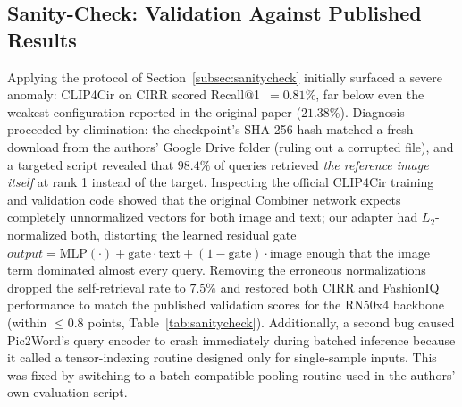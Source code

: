 \documentclass[conference]{IEEEtran}
\begin{document}
\subsection{Sanity-Check: Validation Against Published Results}
\label{subsec:sanitycheckresults}

Applying the protocol of Section~\ref{subsec:sanitycheck} initially surfaced a severe anomaly: CLIP4Cir on CIRR scored Recall@1~$=0.81\%$, far below even the weakest configuration reported in the original paper ($21.38\%$). Diagnosis proceeded by elimination: the checkpoint's SHA-256 hash matched a fresh download from the authors' Google Drive folder (ruling out a corrupted file), and a targeted script revealed that $98.4\%$ of queries retrieved \emph{the reference image itself} at rank 1 instead of the target. Inspecting the official CLIP4Cir training and validation code showed that the original Combiner network expects completely unnormalized vectors for both image and text; our adapter had $L_2$-normalized both, distorting the learned residual gate $output = \text{MLP}(\cdot) + \text{gate}\cdot\text{text} + (1-\text{gate})\cdot\text{image}$ enough that the image term dominated almost every query. Removing the erroneous normalizations dropped the self-retrieval rate to $7.5\%$ and restored both CIRR and FashionIQ performance to match the published validation scores for the RN50x4 backbone (within $\leq\!0.8$ points, Table~\ref{tab:sanitycheck}). Additionally, a second bug caused Pic2Word's query encoder to crash immediately during batched inference because it called a tensor-indexing routine designed only for single-sample inputs. This was fixed by switching to a batch-compatible pooling routine used in the authors' own evaluation script.
\end{document}
